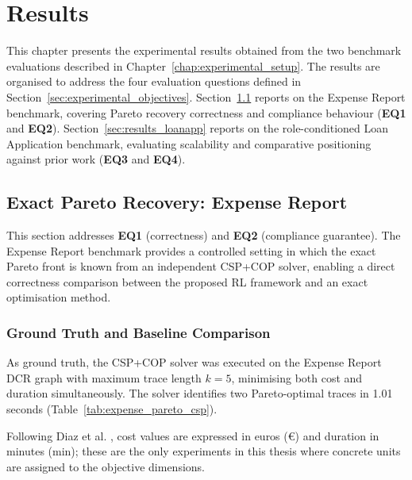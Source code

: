 
\chapter{Results}
\label{chap:results}

This chapter presents the experimental results obtained from the two
benchmark evaluations described in Chapter~\ref{chap:experimental_setup}.
The results are organised to address the four evaluation questions
defined in Section~\ref{sec:experimental_objectives}.
Section~\ref{sec:expense_results} reports on the Expense Report benchmark,
covering Pareto recovery correctness and compliance behaviour
(\textbf{EQ1} and \textbf{EQ2}).
Section~\ref{sec:results_loanapp} reports on the role-conditioned Loan
Application benchmark, evaluating scalability and comparative positioning
against prior work (\textbf{EQ3} and \textbf{EQ4}).

\section{Exact Pareto Recovery: Expense Report}
\label{sec:expense_results}

This section addresses \textbf{EQ1} (correctness) and
\textbf{EQ2} (compliance guarantee). The Expense Report
benchmark provides a controlled setting in which the exact
Pareto front is known from an independent CSP+COP solver,
enabling a direct correctness comparison between the proposed
\ac{RL} framework and an exact optimisation method.

\subsection{Ground Truth and Baseline Comparison}
\label{sec:expense_baseline}

As ground truth, the CSP+COP solver was executed on the Expense Report
\ac{DCR} graph with maximum trace length $k=5$, minimising both cost and duration simultaneously.
The solver identifies two Pareto-optimal traces in 1.01 seconds
(Table~\ref{tab:expense_pareto_csp}).

Following Diaz et al. \cite{Diaz2024Pareto-OptimalModels}, cost values are expressed in euros (€) and duration in minutes (min); these are the only experiments in this thesis where concrete units are assigned to the objective dimensions.

